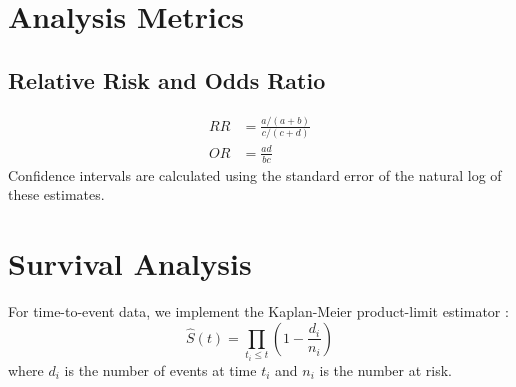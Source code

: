 \documentclass{article}
\begin{document}
\section{Analysis Metrics}
\subsection{Relative Risk and Odds Ratio}
\begin{align}
RR &= \frac{a / (a+b)}{c / (c+d)} \\
OR &= \frac{ad}{bc}
\end{align}
Confidence intervals are calculated using the standard error of the natural log of these estimates.

\section{Survival Analysis}
For time-to-event data, we implement the Kaplan-Meier product-limit estimator \cite{kaplan1958nonparametric}:
\begin{equation}
\hat{S}(t) = \prod_{t_i \le t} \left(1 - \frac{d_i}{n_i}\right)
\end{equation}
where $d_i$ is the number of events at time $t_i$ and $n_i$ is the number at risk.
\end{document}
